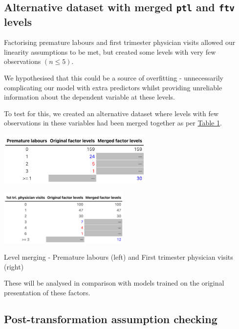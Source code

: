 \documentclass[letterpaper,9pt,twocolumn,twoside,]{pinp}
\begin{document}
\subsection{\texorpdfstring{Alternative dataset with merged \texttt{ptl}
and \texttt{ftv}
levels}{Alternative dataset with merged ptl and ftv levels}}\label{alternative-dataset-with-merged-ptl-and-ftv-levels}

Factorising premature labours and first trimester physician visits
allowed our linearity assumptions to be met, but created some levels
with very few observations \((n\leq 5)\).

We hypothesised that this could be a source of overfitting -
unnecessarily complicating our model with extra predictors whilst
providing unreliable information about the dependent variable at these
levels.

To test for this, we created an alternative dataset where levels with
few observations in these variables had been merged together as per
\href{tab1}{Table 1}.

\begin{table}[h]
\begin{minipage}{.28\textwidth}
  \includegraphics[width=\textwidth, height = 2.65cm]{ptltab}
\end{minipage}%
\begin{minipage}{0.3\textwidth}
  \includegraphics[width=\textwidth, height = 2.75cm]{ftvtab}
\end{minipage}%
\caption{Level merging - Premature labours (left) and First trimester physician visits (right)}
\end{table}

These will be analysed in comparison with models trained on the original
presentation of these factors.

\subsection{Post-transformation assumption
checking}\label{post-transformation-assumption-checking}
\end{document}
